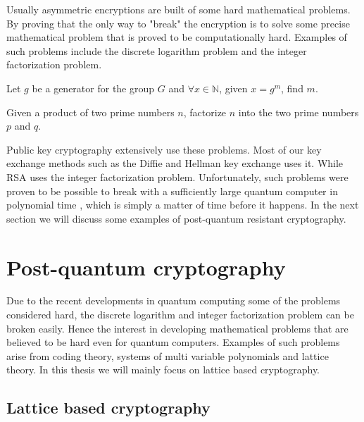 Usually asymmetric encryptions are built of some hard mathematical problems.
By proving that the only way to "break" the encryption is to solve some
precise mathematical problem that is proved to be computationally hard.
Examples of such problems include the discrete logarithm problem and the
integer factorization problem.

\begin{definition}

    Let $g$ be a generator for the group $G$ and $\forall x \in \mathbb{N}$,
    given $x = g^m$, find $m$.

\end{definition}

\begin{definition}

    Given a product of two prime numbers $n$, factorize $n$ into the two prime
    numbers $p$ and $q$.

\end{definition}

Public key cryptography extensively use these problems. Most of our key
exchange methods such as the Diffie and Hellman key exchange uses it. While RSA
uses the integer factorization problem. Unfortunately, such problems were
proven to be possible to break with a sufficiently large quantum computer in
polynomial time \citep{ShorQuantum}, which is simply a matter of time before it
happens. In the next section we will discuss some examples of post-quantum
resistant cryptography.


\section{Post-quantum cryptography}

Due to the recent developments in quantum computing some of the problems
considered hard, the discrete logarithm and integer factorization problem can
be broken easily. Hence the interest in developing mathematical problems that
are believed to be hard even for quantum computers. Examples of such problems
arise from coding theory, systems of multi variable polynomials and lattice
theory. In this thesis we will mainly focus on lattice based cryptography.


\subsection{Lattice based cryptography}

